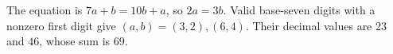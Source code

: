 The equation is $7a+b=10b+a$, so $2a=3b$. Valid base-seven digits with a nonzero first digit give $(a,b)=(3,2),(6,4)$. Their decimal values are $23$ and $46$, whose sum is $\boxed{69}$.
